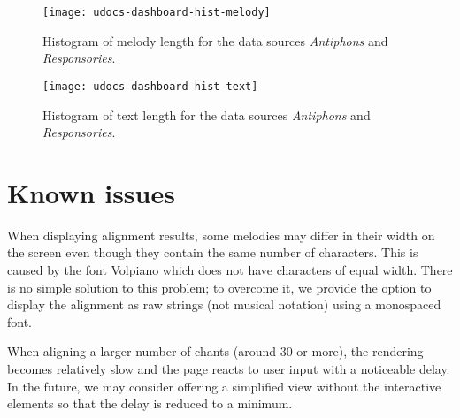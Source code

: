\begin{figure}[!h]
\centering
\texttt{[image: udocs-dashboard-hist-melody]}
\caption{Histogram of melody length for the data sources \emph{Antiphons} and \emph{Responsories}.}
\label{fig:dashboard2}
\end{figure}

\begin{figure}[!h]
\centering
\texttt{[image: udocs-dashboard-hist-text]}
\caption{Histogram of text length for the data sources \emph{Antiphons} and \emph{Responsories}.}
\label{fig:dashboard3}
\end{figure}

\section{Known issues}

When displaying alignment results, some melodies may differ in their width on the screen even though they contain the same number of characters. This is caused by the font
Volpiano which does not have characters of equal width. There is no simple solution to this problem; to overcome it, we provide the option to display the alignment
as raw strings (not musical notation) using a monospaced font.

When aligning a larger number of chants (around 30 or more), the rendering becomes relatively slow and the page reacts to user input with a noticeable delay.
In the future, we may consider offering a simplified view without the interactive elements so that the delay is reduced to a minimum.
